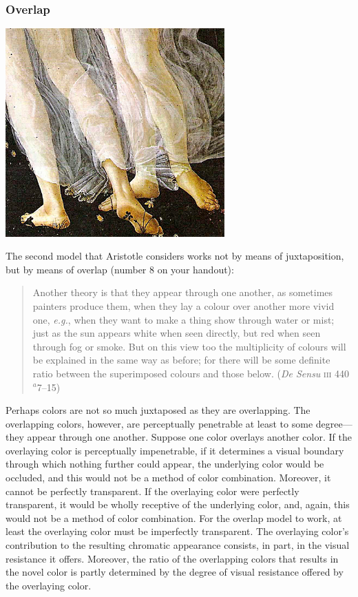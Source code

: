 \begin{frame}[t]\frametitle{Overlap}
	\begin{center}
		\includegraphics[height=8cm]{../../graphics/botticelli1.jpg}
	\end{center}
\end{frame}

The second model that Aristotle considers works not by means of juxtaposition, but by means of overlap (number 8 on your handout):
\begin{quote}
	Another theory is that they appear through one another, as sometimes painters produce them, when they lay a colour over another more vivid one, \emph{e.g.}, when they want to make a thing show through water or mist; just as the sun appears white when seen directly, but red when seen through fog or smoke. But on this view too the multiplicity of colours will be explained in the same way as before; for there will be some definite ratio between the superimposed colours and those below. (\emph{De Sensu} \textsc{iii} 440\( ^{a} \)7--15)
\end{quote}
Perhaps colors are not so much juxtaposed as they are overlapping. The overlapping colors, however, are perceptually penetrable at least to some degree---they appear through one another. Suppose one color overlays another color. If the overlaying color is perceptually impenetrable, if it determines a visual boundary through which nothing further could appear, the underlying color would be occluded, and this would not be a method of color combination. Moreover, it cannot be perfectly transparent. If the overlaying color were perfectly transparent, it would be wholly receptive of the underlying color, and, again, this would not be a method of color combination. For the overlap model to work, at least the overlaying color must be imperfectly transparent. The overlaying color's contribution to the resulting chromatic appearance consists, in part, in the visual resistance it offers. Moreover, the ratio of the overlapping colors that results in the novel color is partly determined by the degree of visual resistance offered by the overlaying color.

